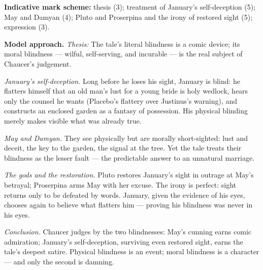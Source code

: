 \documentclass[11pt]{article}
\begin{document}
\begin{corrige}
\textbf{Indicative mark scheme:} thesis (3); treatment of January's self-deception (5); May and Damyan (4); Pluto and Proserpina and the irony of restored sight (5); expression (3).

\textbf{Model approach.}
\emph{Thesis:} The tale's literal blindness is a comic device; its moral blindness --- wilful, self-serving, and incurable --- is the real subject of Chaucer's judgement.

\emph{January's self-deception.} Long before he loses his sight, January is blind: he flatters himself that an old man's lust for a young bride is holy wedlock, hears only the counsel he wants (Placebo's flattery over Justinus's warning), and constructs an enclosed garden as a fantasy of possession. His physical blinding merely makes visible what was already true.

\emph{May and Damyan.} They see physically but are morally short-sighted: lust and deceit, the key to the garden, the signal at the tree. Yet the tale treats their blindness as the lesser fault --- the predictable answer to an unnatural marriage.

\emph{The gods and the restoration.} Pluto restores January's sight in outrage at May's betrayal; Proserpina arms May with her excuse. The irony is perfect: sight returns only to be defeated by words. January, given the evidence of his eyes, chooses again to believe what flatters him --- proving his blindness was never in his eyes.

\emph{Conclusion.} Chaucer judges by the two blindnesses: May's cunning earns comic admiration; January's self-deception, surviving even restored sight, earns the tale's deepest satire. Physical blindness is an event; moral blindness is a character --- and only the second is damning.
\end{corrige}
\end{document}
